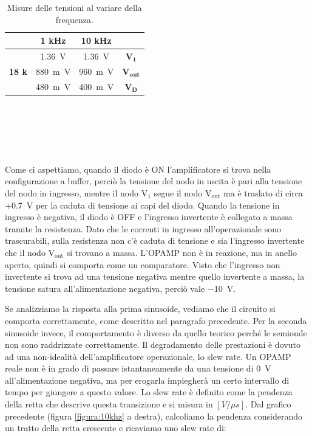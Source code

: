 \documentclass{report}
\begin{document}
\begin{table}[h!]
	\centering
	\begin{tabular}{|c|c|c|c|}
		\cline{2-3} 
		\multicolumn{1}{c|}{} & \textbf{1 kHz} &  \textbf{10 kHz}  &\multicolumn{1}{c}{} \\ 
		\hline
		\multirow{3}{*}{\textbf{18 k\textOmega}} &  \SI{1.36}{\volt} & \SI{1.36}{\volt} & $\mathbf{V_{1}}$ \\
		\cline{2-4}
		& \SI{880}{m\volt} & \SI{960}{m\volt} & $\mathbf{V_{out}}$\\
		\cline{2-4}
		& \SI{480}{m\volt}  & \SI{400}{m\volt} & $\mathbf{V_D}$\\
		\hline
	\end{tabular}
	\caption{Misure delle tensioni al variare della frequenza.}
	\label{table:mis2}
\end{table}
\\\\\\\\\\Come ci aspettiamo, quando il diodo è ON l'amplificatore si trova nella configurazione a buffer, perciò la tensione del nodo in uscita è pari alla tensione del nodo in ingresso, mentre il nodo $\mathrm{V_1}$ segue il nodo $\mathrm{V_{out}}$ ma è traslato di circa +\SI{0.7}{\volt} per la caduta di tensione ai capi del diodo. Quando la tensione in ingresso è negativa, il diodo è OFF e l'ingresso invertente è collegato a massa tramite la resistenza. Dato che le correnti in ingresso all'operazionale sono trascurabili, sulla resistenza non c'è caduta di tensione e sia l'ingresso invertente che il nodo $\mathrm{V_{out}}$ si trovano a massa. L'OPAMP non è in reazione, ma in anello aperto, quindi si comporta come un comparatore. Visto che l'ingresso non invertente si trova ad una tensione negativa mentre quello invertente a massa, la tensione satura all'alimentazione negativa, perciò vale \SI{-10}{\volt}.\par
Se analizziamo la risposta alla prima sinusoide, vediamo che il circuito si comporta correttamente, come descritto nel paragrafo precedente. Per la seconda sinusoide invece, il comportamento è diverso da quello teorico perché le semionde non sono raddrizzate correttamente. Il degradamento delle prestazioni è dovuto ad una non-idealità dell'amplificatore operazionale, lo slew rate. Un OPAMP reale non è in grado di passare istantaneamente da una tensione di \SI{0}{\volt} all'alimentazione negativa, ma per erogarla impiegherà un certo intervallo di tempo per giungere a questo valore. Lo slew rate è definito come la pendenza della retta che descrive questa transizione e si misura in $[V/\mu s]$. Dal grafico precedente (figura \ref{figura:10khz} a destra), calcoliamo la pendenza considerando un tratto della retta crescente e ricaviamo uno slew rate di:
\end{document}

